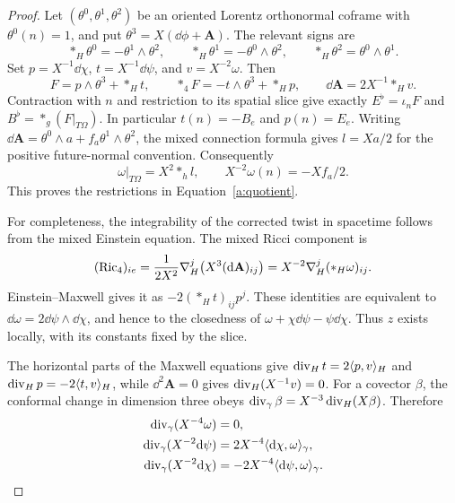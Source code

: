 \begin{proof}
Let $(\theta^0,\theta^1,\theta^2)$ be an oriented Lorentz
orthonormal coframe with $\theta^0(n)=1$, and put
$\theta^3=X(\dd\phi+\mathbf A)$.  The relevant signs are
\[
 *_H\theta^0=-\theta^1\wedge\theta^2,\qquad
 *_H\theta^1=-\theta^0\wedge\theta^2,\qquad
 *_H\theta^2=\theta^0\wedge\theta^1.
\]
Set $p=X^{-1}\dd\chi$, $t=X^{-1}\dd\psi$, and
$v=X^{-2}\omega$.  Then
\begin{equation}\label{a:field-reconstruction}
 F=p\wedge\theta^3+*_Ht,\qquad
 *_4F=-t\wedge\theta^3+*_Hp,\qquad
 \dd\mathbf A=2X^{-1}*_Hv.
\end{equation}
Contraction with $n$ and restriction to its spatial slice give
exactly $E^\flat=\iota_nF$ and
$B^\flat=*_g(F|_{T\Omega})$.  In particular
$t(n)=-B_e$ and $p(n)=E_e$.
Writing
$\dd\mathbf A=\theta^0\wedge a+f_a\theta^1\wedge\theta^2$,
the mixed connection formula gives $l=Xa/2$ for the positive
future-normal convention.  Consequently
\[
 \omega|_{T\Omega}=X^2*_hl,
 \qquad X^{-2}\omega(n)=-Xf_a/2.
\]
This proves the restrictions in Equation~\eqref{a:quotient}.

For completeness, the integrability of the corrected twist in
spacetime follows from the mixed Einstein equation.  The mixed
Ricci component is
\[
 (\operatorname{Ric}_4)_{ie}
   =\frac1{2X^2}\nabla_H^j\big(X^3(\mathrm d\mathbf A)_{ij}\big)
   =X^{-2}\nabla_H^j(*_H\omega)_{ij}.
\]
Einstein--Maxwell gives it as
$-2(*_Ht)_{ij}p^j$.  These identities are equivalent to
$\dd\omega=2\dd\psi\wedge\dd\chi$, and hence to the
closedness of
$\omega+\chi\dd\psi-\psi\dd\chi$.
Thus $z$ exists locally, with its constants fixed by the slice.

The horizontal parts of the Maxwell equations give
$\operatorname{div}_Ht=2\langle p,v\rangle_H$ and
$\operatorname{div}_Hp=-2\langle t,v\rangle_H$, while
$\dd^2\mathbf A=0$ gives $\operatorname{div}_H(X^{-1}v)=0$.
For a covector $\beta$, the conformal change in dimension three
obeys $\operatorname{div}_\gamma\beta=X^{-3}\operatorname{div}_H(X\beta)$.
Therefore
\begin{align}\label{a:map-divergences}
 \operatorname{div}_\gamma(X^{-4}\omega)&=0,\notag\\
 \operatorname{div}_\gamma(X^{-2}\mathrm d\psi)
       &=2X^{-4}\langle\mathrm d\chi,\omega\rangle_\gamma,\\
 \operatorname{div}_\gamma(X^{-2}\mathrm d\chi)
       &=-2X^{-4}\langle\mathrm d\psi,\omega\rangle_\gamma.\notag
\end{align}


\end{proof}
